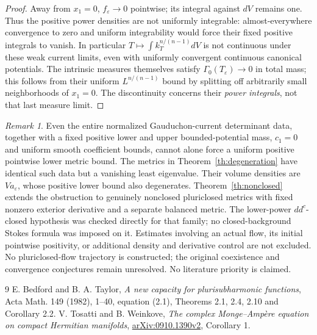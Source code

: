 \documentclass[11pt]{article}
\theoremstyle{remark}\newtheorem{remark}[theorem]{Remark}
\begin{document}
\begin{proof}
Away from $x_1=0$, $f_\varepsilon\to0$ pointwise; its integral
against $dV$ remains one. Thus the positive power densities are not
uniformly integrable: almost-everywhere convergence to zero and
uniform integrability would force their fixed positive integrals to
vanish. In particular $T\mapsto\int k_T^{n/(n-1)}dV$ is not
continuous under these weak current limits, even with uniformly
convergent continuous canonical potentials. The intrinsic measures
themselves satisfy $\Gamma_0(T_\varepsilon)\to0$ in total mass;
this follows from their uniform $L^{n/(n-1)}$ bound by splitting
off arbitrarily small neighborhoods of $x_1=0$. The discontinuity
concerns their \emph{power integrals}, not that last measure limit.
\end{proof}

\begin{remark}
Even the entire normalized Gauduchon-current determinant data,
together with a fixed positive lower and upper bounded-potential mass,
$c_1=0$ and uniform smooth coefficient bounds,
cannot alone force a uniform positive pointwise lower metric bound.
The metrics in Theorem~\ref{th:degeneration} have identical such data but a vanishing least
eigenvalue. Their volume densities are $Va_\varepsilon$, whose
positive lower bound also degenerates. Theorem~\ref{th:nonclosed}
extends the obstruction to genuinely nonclosed pluriclosed metrics
with fixed nonzero exterior derivative and a separate balanced metric.
The lower-power $dd^c$-closed hypothesis was checked directly for that
family; no closed-background Stokes formula was imposed on it.
Estimates involving an
actual flow, its initial pointwise positivity, or additional density
and derivative control are not excluded. No pluriclosed-flow
trajectory is constructed; the original coexistence and convergence
conjectures remain unresolved. No literature priority is claimed.
\end{remark}
\begin{thebibliography}{9}
 E. Bedford and B. A. Taylor,
\emph{A new capacity for plurisubharmonic functions}, Acta Math.
149 (1982), 1--40, equation (2.1), Theorems 2.1, 2.4, 2.10 and
Corollary 2.2.
 V. Tosatti and B. Weinkove,
\emph{The complex Monge--Amp\`ere equation on compact Hermitian
manifolds}, \href{https://arxiv.org/abs/0910.1390v2}{arXiv:0910.1390v2},
Corollary 1.
\end{thebibliography}
\end{document}

